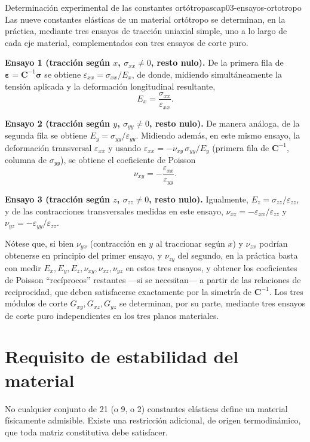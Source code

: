 \begin{ejemplo}{Determinación experimental de las constantes ortótropas}{cap03-ensayos-ortotropo}
Las nueve constantes elásticas de un material ortótropo se determinan, en la práctica, mediante tres ensayos de tracción uniaxial simple, uno a lo largo de cada eje material, complementados con tres ensayos de corte puro.

\textbf{Ensayo 1 (tracción según $x$, $\sigma_{xx}\neq 0$, resto nulo).} De la primera fila de $\bm\varepsilon=\bm C^{-1}\bm\sigma$ se obtiene $\varepsilon_{xx}=\sigma_{xx}/E_x$, de donde, midiendo simultáneamente la tensión aplicada y la deformación longitudinal resultante,
\[
E_x = \frac{\sigma_{xx}}{\varepsilon_{xx}}.
\]

\textbf{Ensayo 2 (tracción según $y$, $\sigma_{yy}\neq0$, resto nulo).} De manera análoga, de la segunda fila se obtiene $E_y=\sigma_{yy}/\varepsilon_{yy}$. Midiendo además, en este mismo ensayo, la deformación transversal $\varepsilon_{xx}$ y usando $\varepsilon_{xx}=-\nu_{xy}\,\sigma_{yy}/E_y$ (primera fila de $\bm C^{-1}$, columna de $\sigma_{yy}$), se obtiene el coeficiente de Poisson
\[
\nu_{xy} = -\frac{\varepsilon_{xx}}{\varepsilon_{yy}}.
\]

\textbf{Ensayo 3 (tracción según $z$, $\sigma_{zz}\neq0$, resto nulo).} Igualmente, $E_z=\sigma_{zz}/\varepsilon_{zz}$, y de las contracciones transversales medidas en este ensayo, $\nu_{xz}=-\varepsilon_{xx}/\varepsilon_{zz}$ y $\nu_{yz}=-\varepsilon_{yy}/\varepsilon_{zz}$.

Nótese que, si bien $\nu_{yx}$ (contracción en $y$ al traccionar según $x$) y $\nu_{zx}$ podrían obtenerse en principio del primer ensayo, y $\nu_{zy}$ del segundo, en la práctica basta con medir $E_x,E_y,E_z,\nu_{xy},\nu_{xz},\nu_{yz}$ en estos tres ensayos, y obtener los coeficientes de Poisson ``recíprocos'' restantes —si se necesitan— a partir de las relaciones de reciprocidad, que deben satisfacerse exactamente por la simetría de $\bm C^{-1}$. Los tres módulos de corte $G_{xy},G_{xz},G_{yz}$ se determinan, por su parte, mediante tres ensayos de corte puro independientes en los tres planos materiales.
\end{ejemplo}

\section{Requisito de estabilidad del material}
\label{sec:cap03-estabilidad}

No cualquier conjunto de 21 (o 9, o 2) constantes elásticas define un material físicamente admisible. Existe una restricción adicional, de origen termodinámico, que toda matriz constitutiva debe satisfacer.

